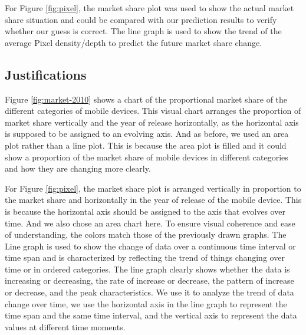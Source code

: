 \documentclass[conference]{IEEEtran}
\begin{document}
For Figure \ref{fig:pixel}, the market share plot was used to show the actual market share situation and could be compared with our prediction results to verify whether our guess is correct. The line graph is used to show the trend of the average Pixel density/depth to predict the future market share change.

\subsection{Justifications}
Figure \ref{fig:market-2010} shows a chart of the proportional market share of the different categories of mobile devices. This visual chart arranges the proportion of market share vertically and the year of release horizontally, as the horizontal axis is supposed to be assigned to an evolving axis. And as before, we used an area plot rather than a line plot. This is because the area plot is filled and it could show a proportion of the market share of mobile devices in different categories and how they are changing more clearly. 

For Figure \ref{fig:pixel}, the market share plot is arranged vertically in proportion to the market share and horizontally in the year of release of the mobile device. This is because the horizontal axis should be assigned to the axis that evolves over time. And we also chose an area chart here. To ensure visual coherence and ease of understanding, the colors match those of the previously drawn graphs. The Line graph is used to show the change of data over a continuous time interval or time span and is characterized by reflecting the trend of things changing over time or in ordered categories. The line graph clearly shows whether the data is increasing or decreasing, the rate of increase or decrease, the pattern of increase or decrease, and the peak characteristics. We use it to analyze the trend of data change over time, we use the horizontal axis in the line graph to represent the time span and the same time interval, and the vertical axis to represent the data values at different time moments.



\end{document}
